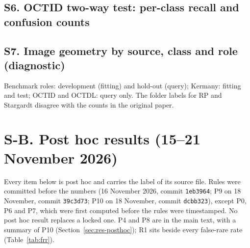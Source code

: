 \subsection*{S6. OCTID two-way test: per-class recall and confusion counts}
\begin{table}[!htbp]
\caption{OCTID two-way test per $K$: macro recall, per-class recall and mean confusion counts over draws (denominators 102 CSC and 102 MH), and draws in which every query went to one class.}
\label{tab:twoway}
\centering\footnotesize

\end{table}

\subsection*{S7. Image geometry by source, class and role (diagnostic)}
\begin{table}[!htbp]
\caption{Image geometry by source, class and role, from the original files: median (min--max). Border share: the share of image area in complete edge rows and columns whose grey range is at most 8. Near-white share: the share of pixels at 250 or above. Retained fraction: the share of the image each input transform keeps (MIRAGE and Inception-v3 resize the whole image; DINOv2 and RETFound resize and centre-crop). Descriptive; it gates nothing.}
\label{tab:geometry}
\centering\scriptsize
\setlength{\tabcolsep}{3pt}

\par\smallskip
\parbox{\textwidth}{\footnotesize Benchmark roles: development (fitting) and hold-out (query); Kermany: fitting and test; OCTID and OCTDL: query only. \fnRS The folder labels for RP and Stargardt disagree with the counts in the original paper.}
\end{table}

\clearpage
\section*{S-B. Post hoc results (15--21 November 2026)}
Every item below is post hoc and carries the label of its source file. Rules were committed before the numbers (16 November 2026, commit \texttt{1eb3964}; P9 on 18 November, commit \texttt{39c3d73}; P10 on 18 November, commit \texttt{dcbb323}), except P0, P6 and P7, which were first computed before the rules were timestamped. No post hoc result replaces a locked one. P4 and P8 are in the main text, with a summary of P10 (Section~\ref{sec:res-posthoc}); R1 sits beside every false-rare rate (Table~\ref{tab:frr}).

